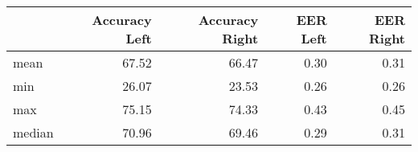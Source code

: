 \begin{tabular}{lrrrr}
\toprule
{} &  Accuracy Left &  Accuracy Right &  EER Left &  EER Right \\
\midrule
mean   &          67.52 &           66.47 &      0.30 &       0.31 \\
min    &          26.07 &           23.53 &      0.26 &       0.26 \\
max    &          75.15 &           74.33 &      0.43 &       0.45 \\
median &          70.96 &           69.46 &      0.29 &       0.31 \\
\bottomrule
\end{tabular}
